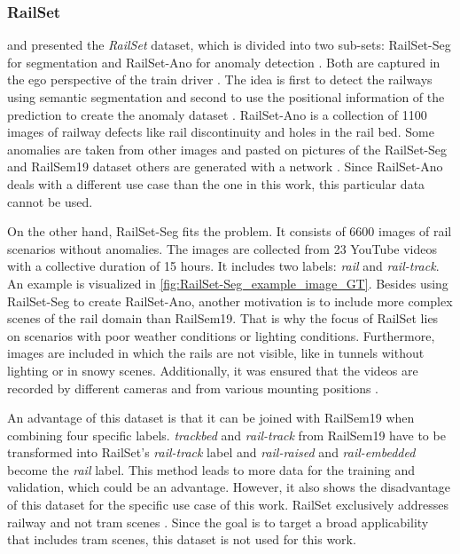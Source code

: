 \clearpage

\subsubsection{RailSet}
\label{subsubsec:RailSet}
\cite{railSet2022} and \cite{hadded2022application} presented the \textit{RailSet} dataset,
which is divided into two sub-sets: RailSet-Seg for segmentation and RailSet-Ano for anomaly detection \cite{railSet2022}.
Both are captured in the ego perspective of the train driver \cite{railSet2022} \cite{hadded2022application}.
The idea is first to detect the railways using semantic segmentation and second to use the positional information of the prediction to create the anomaly dataset \cite{railSet2022}.
RailSet-Ano is a collection of 1100 images of railway defects like rail discontinuity and holes in the rail bed.
Some anomalies are taken from other images and pasted on pictures of the RailSet-Seg and RailSem19 dataset others are generated with a network \cite{railSet2022}.
Since RailSet-Ano deals with a different use case than the one in this work, this particular data cannot be used.

On the other hand, RailSet-Seg fits the problem. It consists of 6600 images of rail scenarios without anomalies.
The images are collected from 23 YouTube videos with a collective duration of 15 hours. It includes two labels: \textit{rail} and \textit{rail-track}. An example is visualized in \autoref{fig:RailSet-Seg_example_image_GT}.
Besides using RailSet-Seg to create RailSet-Ano, another motivation is to include more complex scenes of the rail domain than RailSem19.
That is why the focus of RailSet lies on scenarios with poor weather conditions or lighting conditions.
Furthermore, images are included in which the rails are not visible, like in tunnels without lighting or in snowy scenes.
Additionally, it was ensured that the videos are recorded by different cameras and from various mounting positions \cite{railSet2022} \cite{hadded2022application}. 

An advantage of this dataset is that it can be joined with RailSem19 when combining four specific labels.
\textit{trackbed} and \textit{rail-track} from RailSem19 have to be transformed into RailSet's \textit{rail-track} label and \textit{rail-raised} and \textit{rail-embedded} become the \textit{rail} label.
This method leads to more data for the training and validation, which could be an advantage.
However, it also shows the disadvantage of this dataset for the specific use case of this work.
RailSet exclusively addresses railway and not tram scenes \cite{hadded2022application}.
Since the goal is to target a broad applicability that includes tram scenes, this dataset is not used for this work.


